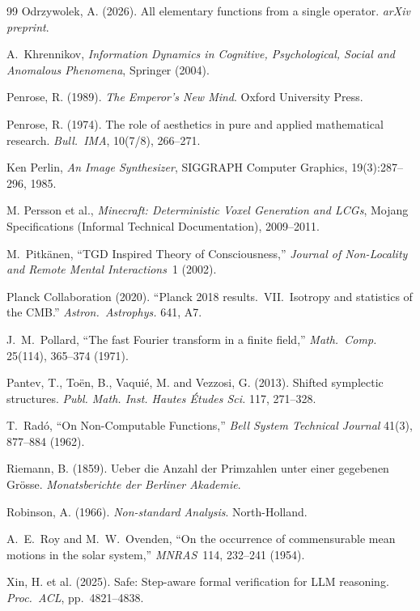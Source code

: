 \begin{thebibliography}{99}
 Odrzywolek, A. (2026). All elementary functions from a single operator. \emph{arXiv preprint}.

 A.~Khrennikov, \emph{Information Dynamics in Cognitive, Psychological, Social and Anomalous Phenomena}, Springer (2004).

 Penrose, R. (1989). \emph{The Emperor's New Mind}. Oxford University Press.

 Penrose, R. (1974). The role of aesthetics in pure and applied mathematical research. \emph{Bull.\ IMA}, 10(7/8), 266--271.

Ken Perlin,
\textit{An Image Synthesizer},
SIGGRAPH Computer Graphics, 19(3):287--296, 1985.

M. Persson et al.,
\textit{Minecraft: Deterministic Voxel Generation and LCGs},
Mojang Specifications (Informal Technical Documentation), 2009--2011.

 M.~Pitk\"anen, ``TGD Inspired Theory of Consciousness,'' \emph{Journal of Non-Locality and Remote Mental Interactions}\ 1 (2002).

Planck Collaboration (2020).
``Planck 2018 results.\ VII.\ Isotropy and statistics of the CMB.''
\textit{Astron.\ Astrophys.} 641, A7.

J.~M.~Pollard,
``The fast Fourier transform in a finite field,''
\emph{Math.\ Comp.} 25(114), 365--374 (1971).

 Pantev, T., To\"en, B., Vaqui\'e, M. and Vezzosi, G. (2013). Shifted symplectic structures. \emph{Publ. Math. Inst. Hautes \'Etudes Sci.} 117, 271--328.

T.~Rad\'o,
``On Non-Computable Functions,''
\emph{Bell System Technical Journal} 41(3), 877--884 (1962).

 Riemann, B. (1859). Ueber die Anzahl der Primzahlen unter einer gegebenen Gr\"osse. \emph{Monatsberichte der Berliner Akademie}.

 Robinson, A. (1966). \emph{Non-standard Analysis}. North-Holland.

 A.~E.~Roy and M.~W.~Ovenden, ``On the occurrence of commensurable mean motions in the solar system,'' \emph{MNRAS}\ 114, 232--241 (1954).

 Xin, H. et al. (2025). Safe: Step-aware formal verification for LLM reasoning. \emph{Proc.\ ACL}, pp.~4821--4838.


\end{thebibliography}
